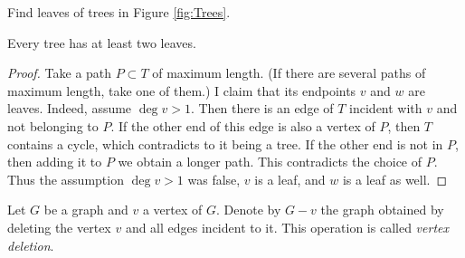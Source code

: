 \begin{page}
\setcounter{section}{2}
\setcounter{subsection}{2}
\setcounter{dfn}{3}
\label{portion:256}


Find leaves of trees in Figure \ref{fig:Trees}.


\end{page}

\begin{page}
\setcounter{section}{2}
\setcounter{subsection}{2}
\setcounter{dfn}{4}
\label{portion:258}

\begin{lem}
\label{lem:LeafTree}
Every tree has at least two leaves.
\end{lem}

\end{page}

\begin{page}
\setcounter{section}{2}
\setcounter{subsection}{2}
\setcounter{dfn}{4}
\label{portion:259}

\begin{proof}
Take a path $P \subset T$ of maximum length.
(If there are several paths of maximum length, take one of them.)
I claim that its endpoints $v$ and $w$ are leaves.
Indeed, assume $\deg v > 1$.
Then there is an edge of $T$ incident with $v$ and not belonging to $P$.
If the other end of this edge is also a vertex of $P$, then $T$ contains a cycle, which contradicts to it being a tree.
If the other end is not in $P$, then adding it to $P$ we obtain a longer path.
This contradicts the choice of $P$.
Thus the assumption $\deg v > 1$ was false, $v$ is a leaf, and $w$ is a leaf as well.
\end{proof}


\end{page}

\begin{page}
\setcounter{section}{2}
\setcounter{subsection}{2}
\setcounter{dfn}{5}
\label{portion:261}

\begin{dfn}
Let $G$ be a graph and $v$ a vertex of $G$.
Denote by $G - v$ the graph obtained by deleting the vertex $v$ and all edges incident to it.
This operation is called \emph{vertex deletion}.
\end{dfn}

\end{page}

